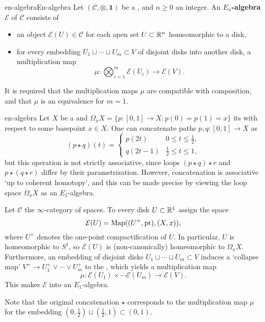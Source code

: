 \begin{topic}{en-algebra}{En-algebra}
    Let $(\mathcal{C}, \otimes, \textbf{1})$ be a  , and $n \ge 0$ an integer. An \textbf{$E_n$-algebra} $\mathcal{E}$ of $\mathcal{C}$ consists of
    \begin{itemize}
        \item an object $\mathcal{E}(U) \in \mathcal{C}$ for each open set $U \subset \mathbb{R}^n$ homeomorphic to a disk,
        \item for every embedding $U_1 \sqcup \cdots \sqcup U_m \subset V$ of disjoint disks into another disk, a multiplication map
        \[ \mu : \bigotimes_{i = 1}^{m} \mathcal{E}(U_i) \to \mathcal{E}(V) . \]
    \end{itemize}
    It is required that the multiplication maps $\mu$ are compatible with composition, and that $\mu$ is an equivalence for $m = 1$.
\end{topic}

\begin{example}{en-algebra}
    Let $X$ be a  and $\Omega_x X = \{ p : [0, 1] \to X : p(0) = p(1) = x \}$ its  with respect to some basepoint $x \in X$. One can concatenate paths $p, q : [0, 1] \to X$ as
    \[ (p \star q)(t) = \left\{ \begin{array}{cl}
         p(2t) & 0 \le t \le \tfrac{1}{2} , \\
         q(2t - 1) & \tfrac{1}{2} \le t \le 1 ,
    \end{array} \right. \]
    but this operation is not strictly associative, since loops $(p \star q) \star r$ and $p \star (q \star r)$ differ by their parametrization. However, concatenation is associative `up to coherent homotopy', and this can be made precise by viewing the loop space $\Omega_x X$ as an $E_1$-algebra.
    
    Let $\mathcal{C}$ the $\infty$-category of spaces. To every disk $U \subset \mathbb{R}^1$ assign the space
    \[ \mathcal{E}(U) = \textup{Map}((U^+, \textup{pt}), (X, x)) , \]
    where $U^+$ denotes the one-point compactification of $U$. In particular, $U$ is homeomorphic to $S^1$, so $\mathcal{E}(U)$ is (non-canonically) homeomorphic to $\Omega_x X$. Furthermore, an embedding of disjoint disks $U_1 \sqcup \cdots \sqcup U_m \subset V$ induces a `collapse map' $V^+ \to U_1^+ \vee \cdots \vee U_m^+$ to the , which yields a multiplication map
    \[ \mu : \mathcal{E}(U_1) \times \cdots \mathcal{E}(U_m) \to \mathcal{E}(V) . \]
    This makes $\mathcal{E}$ into an $E_1$-algebra.
    
    Note that the original concatenation $\star$ corresponds to the multiplication map $\mu$ for the embedding $(0, \tfrac{1}{2}) \sqcup (\tfrac{1}{2}, 1) \subset (0, 1)$.
\end{example}
